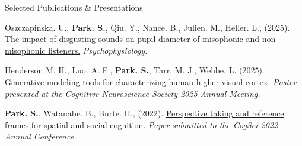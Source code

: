 \documentclass{resume} %
\begin{document}
    \begin{rSection}{Selected Publications \& Presentations}
        \setlength{\hangingindent}{1.27cm}
        
        
        \begin{hangingpar}
            Oszczapinska. U., \textbf{Park. S.}, Qiu. Y., Nance. B., Julien. 
            M., Heller. L., (2025). 
            \href{https://doi.org/10.1111/psyp.70014}{The impact of disgusting 
                sounds on pupil diameter of misophonic and non-misophonic 
                listeners.}
            \textit{Psychophysiology.}
        \end{hangingpar}
        
        \begin{hangingpar}
            Henderson M. H., Luo. A. F., \textbf{Park. S.}, Tarr. M. J., Wehbe. 
            L. (2025). \href{https://www.cogneurosociety.org/poster/?id=6325}{
                Generative modeling tools for characterizing human higher 
                visual 
                cortex.}
            \em{Poster presented at the Cognitive Neuroscience Society 2025 
                Annual Meeting.}
        \end{hangingpar}
        
        \begin{hangingpar}
            \textbf{Park. S.}, Watanabe. B., Burte. H., (2022). 
            \href{https://escholarship.org/uc/item/6wq5x6nn}{Perspective taking 
                and reference frames for spatial and social cognition.} 
            \em{Paper submitted to the CogSci 2022 Annual Conference.}
        \end{hangingpar}
        
    \end{rSection}
    
    
\end{document}
